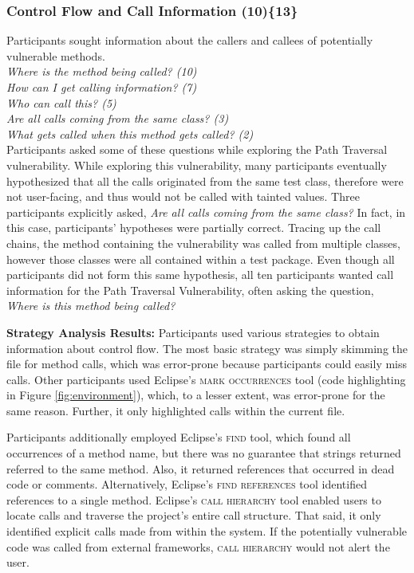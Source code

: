 \documentclass[10pt,journal,compsoc]{IEEEtran}
\begin{document}

\subsubsection{Control Flow and Call Information (10)\{13\}}\label{cf}

Participants sought information about the callers and callees of potentially vulnerable methods.
\\

\noindent\emph{Where is the method being called? (10)} \\
\emph{How can I get calling information? (7)} \\
\emph{Who can call this? (5)} \\
\emph{Are all calls coming from the same class? (3)} \\
\emph{What gets called when this method gets called? (2)}
\\

Participants asked some of these questions while exploring the Path Traversal vulnerability.
While exploring this vulnerability, many participants eventually hypothesized that all the calls originated from the same test class, therefore were not user-facing, and thus would not be called with tainted values.
Three participants explicitly asked, \textit{Are all calls coming from the same class?} 
In fact, in this case, participants' hypotheses were partially correct. 
Tracing up the call chains, the method containing the vulnerability was called from multiple classes, however those classes were all contained within a test package.
Even though all participants did not form this same hypothesis, all ten participants wanted call information for the Path Traversal Vulnerability, often asking the question, \textit{Where is this method being called?} 

 
\textbf{Strategy Analysis Results:}
Participants used various strategies to obtain information about control flow.
The most basic strategy was simply skimming the file for method calls, which was error-prone because participants could easily miss calls.
Other participants used Eclipse's \textsc{mark occurrences} tool (code highlighting in Figure \ref{fig:environment}), which, to a lesser extent, was error-prone for the same reason. 
Further, it only highlighted calls within the current file.

Participants additionally employed Eclipse's \textsc{find} tool, which found all occurrences of a method name, but there was no guarantee that strings returned referred to the same method.
Also, it returned references that occurred in dead code or comments.
Alternatively, Eclipse's \textsc{find references} tool identified references to a single method.
Eclipse's \textsc{call hierarchy} tool enabled users to locate calls and traverse the project's entire call structure.
That said, it only identified explicit calls made from within the system. 
If the potentially vulnerable code was called from external frameworks, \textsc{call hierarchy} would not alert the user.
\end{document}
